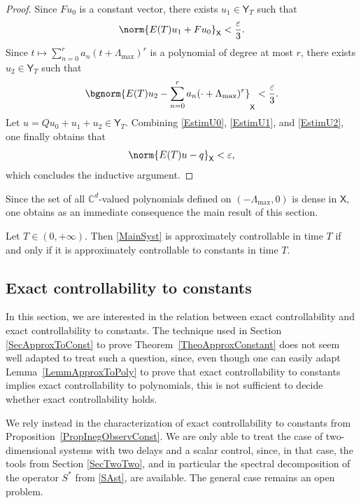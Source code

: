 \begin{proof}
Since $F u_0$ is a constant vector, there exists $u_1 \in \mathsf Y_T$ such that
\begin{equation}
\label{EstimU1}
\norm{E(T) u_1 + F u_0}_{\mathsf X} < \frac{\varepsilon}{3}.
\end{equation}
Since $t \mapsto \sum_{n=0}^r a_n (t + \Lambda_{\max})^r$ is a polynomial of degree at most $r$, there exists $u_2 \in \mathsf Y_T$ such that
\begin{equation}
\label{EstimU2}
\bgnorm{E(T) u_2 - \sum_{n=0}^r a_n (\cdot + \Lambda_{\max})^r}_{\mathsf X} < \frac{\varepsilon}{3}.
\end{equation}
Let $u = Q u_0 + u_1 + u_2 \in \mathsf Y_T$. Combining \eqref{EstimU0}, \eqref{EstimU1}, and \eqref{EstimU2}, one finally obtains that
\[
\norm{E(T) u - q}_{\mathsf X} < \varepsilon,
\]
which concludes the inductive argument.
\end{proof}

Since the set of all $\mathbb C^d$-valued polynomials defined on $(-\Lambda_{\max}, 0)$ is dense in $\mathsf X$, one obtains as an immediate consequence the main result of this section.

\begin{theo}
\label{TheoApproxConstant}
Let $T \in (0, +\infty)$. Then \eqref{MainSyst} is approximately controllable in time $T$ if and only if it is approximately controllable to constants in time $T$.
\end{theo}

\subsection{Exact controllability to constants}

In this section, we are interested in the relation between exact controllability and exact controllability to constants. The technique used in Section \ref{SecApproxToConst} to prove Theorem~\ref{TheoApproxConstant} does not seem well adapted to treat such a question, since, even though one can easily adapt Lemma~\ref{LemmApproxToPoly} to prove that exact controllability to constants implies exact controllability to polynomials, this is not sufficient to decide whether exact controllability holds.

We rely instead in the characterization of exact controllability to constants from Proposition~\ref{PropInegObservConst}. We are only able to treat the case of two-dimensional systems with two delays and a scalar control, since, in that case, the tools from Section \ref{SecTwoTwo}, and in particular the spectral decomposition of the operator $S^\ast$ from \eqref{SAst}, are available. The general case remains an open problem.

